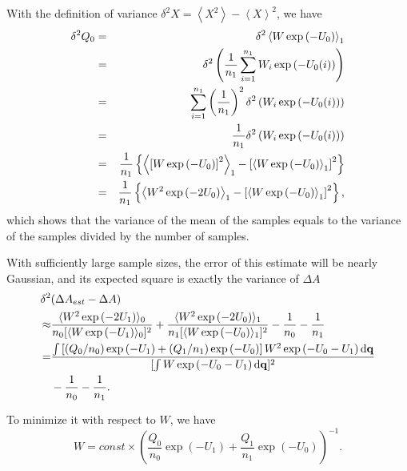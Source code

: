 With the definition of variance $\delta^2X=\left\langle X^{2}\right\rangle -\left\langle X\right\rangle ^{2}$,
we have 
\begin{eqnarray}
	\delta^2Q_0 & = & \delta^2\left\langle W\exp{(-U_{0})}\right\rangle_{1}\notag\\
	& = & \delta^2\left(\frac{1}{n_1}\sum_{i=1}^{n_1}W_{i}\exp{\left(-U_{0}(i)\right)}\right)\notag\\
	& = & \sum_{i=1}^{n_{1}}\left(\frac{1}{n_{1}}\right)^{2}\delta^2\left(W_{i}\exp{\left(-U_{0}(i)\right)}\right)\notag\\
	& = & \frac{1}{n_{1}}\delta^2\left(W_{i}\exp{\left(-U_{0}(i)\right)}\right)\notag\\
	& = & \frac{1}{n_{1}}\left\{ \left< \left[W\exp{(-U_{0})}\right]^{2}\right>_{1}-\left[\left< W\exp{(-U_{0})}\right>_{1}\right]^{2}\right\}\notag\\
	& = & \frac{1}{n_{1}}\left\{ \left< W^{2}\exp{(-2U_{0})}\right>_{1}-\left[\left< W\exp{(-U_{0})}\right>_{1}\right]^{2}\right\},
\end{eqnarray}
which shows that the variance of the mean of the samples equals to the variance of the samples divided by the number of samples.

With sufficiently large sample sizes, the error of this estimate will
be nearly Gaussian, and its expected square is exactly the variance
of $\Delta A$ 
\begin{align}
	\delta^2 & (\Delta A_{est}-\Delta A)\nonumber \\
	\approx & \frac{\langle W^{2}\exp{(-2U_{1})}\rangle_{0}}{n_{0}[\langle W\exp{(-U_{1})}\rangle_{0}]^{2}}+\frac{\langle W^{2}\exp{(-2U_{0})}\rangle_{1}}{n_{1}[\langle W\exp{(-U_{0})}\rangle_{1}]^{2}}-\frac{1}{n_{0}}-\frac{1}{n_{1}}\nonumber \\
	= & \frac{\int\left[(Q_{0}/n_{0})\exp{(-U_{1})}+(Q_{1}/n_{1})\exp{(-U_{0})}\right]W^{2}\exp{(-U_{0}-U_{1})}\mathop{}\!\mathrm{d}\mathbf{q}}{[\int W\exp{(-U_{0}-U_{1})}\mathop{}\!\mathrm{d}\mathbf{q}]^{2}}\notag\\
	  &-\frac{1}{n_{0}}-\frac{1}{n_{1}}.\label{eq:FEM:BAR:expectation}
\end{align}

To minimize it with respect to $W$, we have
\begin{equation}
	W=const\times\left(\frac{Q_{0}}{n_{0}}\exp{(-U_{1})}+\frac{Q_{1}}{n_{1}}\exp{(-U_{0})}\right)^{-1}.
	\label{eq:FEM:BAR:W}
\end{equation}

